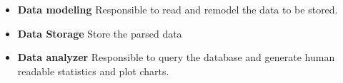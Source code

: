 \documentclass{scrreprt}
\begin{document}
\begin{itemize}
  \item \textbf{Data modeling} \- Responsible to read and remodel the data to be stored.
  \item \textbf{Data Storage} \- Store the parsed data
  \item \textbf{Data analyzer} \- Responsible to query the database and generate
    human readable statistics and plot charts.
\end{itemize}

\end{document}

